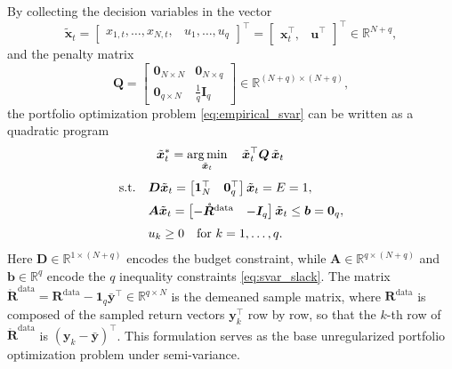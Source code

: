 By collecting the decision variables in the vector
\begin{equation*}
    \tilde{\bm{x}}_t = \begin{bmatrix} x_{1,t}, \dots, x_{N,t}, & u_1, \dots, u_q \end{bmatrix}^\top
    = \begin{bmatrix} \bm{x}_t^\top, & \bm{u}^\top \end{bmatrix}^\top \in \mathbb{R}^{N+q},
\end{equation*}
and the penalty matrix
\begin{equation*}
    \bm{Q} = \begin{bmatrix} \bm{0}_{N \times N} & \bm{0}_{N \times q} \\ \bm{0}_{q \times N} & \tfrac{1}{q} \bm{I}_q \end{bmatrix}
    \in \mathbb{R}^{(N+q) \times (N+q)},
\end{equation*}
the portfolio optimization problem \eqref{eq:empirical_svar} can be written as a quadratic program
\begin{equation} \label{eq:svar_base_qp}
\begin{aligned}
    & \ \ \tilde{\bm{x}}_t^* = \operatorname*{arg\,min}_{\tilde{\bm{x}}_t} \quad
     \tilde{\bm{x}}_t^\top \bm{Q}\, \tilde{\bm{x}}_t \\[4pt]
    \text{s.t.} \quad
    & \bm{D} \tilde{\bm{x}}_t =
    \begin{bmatrix} \bm{1}_N^\top & \bm{0}_q^\top \end{bmatrix}
    \tilde{\bm{x}}_t = E = 1, \\[2pt]
    & \bm{A} \tilde{\bm{x}}_t =
    \begin{bmatrix} -\mathring{\bm{R}}^{\text{data}} & -\bm{I}_q \end{bmatrix}
    \tilde{\bm{x}}_t \le \bm{b} = \bm{0}_q, \\[2pt]
    & u_k \ge 0 \quad \text{for } k = 1, \dots, q.
\end{aligned}
\end{equation}
Here $\bm{D} \in \mathbb{R}^{1 \times (N+q)}$ encodes the budget constraint, while $\bm{A} \in \mathbb{R}^{q \times (N+q)}$
and $\bm{b} \in \mathbb{R}^q$ encode the $q$ inequality constraints \eqref{eq:svar_slack}. The matrix
$\mathring{\bm{R}}^{\text{data}} = \bm{R}^{\text{data}} - \bm{1}_q \bar{\bm{y}}^\top \in \mathbb{R}^{q \times N}$ is the
demeaned sample matrix, where $\bm{R}^{\text{data}}$ is composed of the sampled return vectors $\bm{y}_k^\top$ row by
row, so that the $k$-th row of $\mathring{\bm{R}}^{\text{data}}$ is $(\bm{y}_k - \bar{\bm{y}})^\top$.
This formulation serves as the base
unregularized portfolio optimization problem under semi-variance.


